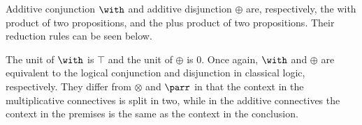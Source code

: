 Additive conjunction $\with$ and additive disjunction $\oplus$ are, respectively, the with product of two propositions, and the plus product of two propositions. Their reduction rules can be seen below.
\begin{center}
     \begin{minipage}{0.3\textwidth}
        \begin{prooftree}
        \end{prooftree}
    \end{minipage}
    \hfill
    \begin{minipage}{0.3\textwidth}
        \begin{prooftree}
        \end{prooftree}
    \end{minipage}
    \hfill
    \begin{minipage}{0.3\textwidth}
        \begin{prooftree}
        \end{prooftree}
    \end{minipage}
\end{center}
The unit of $\with$ is $\top$ and the unit of $\oplus$ is $0$. Once again, $\with$ and $\oplus$ are equivalent to the logical conjunction and disjunction in classical logic, respectively. They differ from $\otimes$ and $\parr$ in that the context in the multiplicative connectives is split in two, while in the additive connectives the context in the premises is the same as the context in the conclusion.

